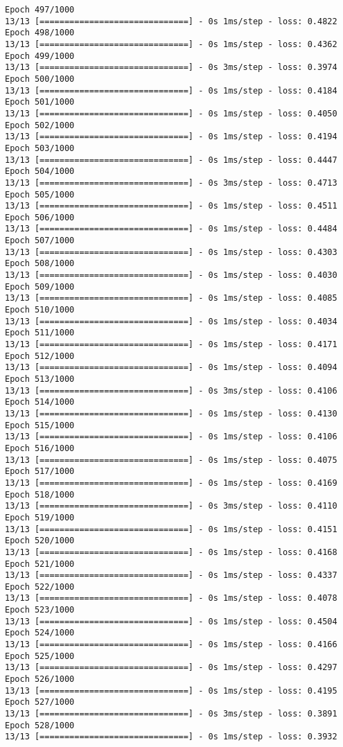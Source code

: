 \documentclass[11pt]{article}
\begin{document}
\begin{Verbatim}[commandchars=\\\{\}]
Epoch 497/1000
13/13 [==============================] - 0s 1ms/step - loss: 0.4822
Epoch 498/1000
13/13 [==============================] - 0s 1ms/step - loss: 0.4362
Epoch 499/1000
13/13 [==============================] - 0s 3ms/step - loss: 0.3974
Epoch 500/1000
13/13 [==============================] - 0s 1ms/step - loss: 0.4184
Epoch 501/1000
13/13 [==============================] - 0s 1ms/step - loss: 0.4050
Epoch 502/1000
13/13 [==============================] - 0s 1ms/step - loss: 0.4194
Epoch 503/1000
13/13 [==============================] - 0s 1ms/step - loss: 0.4447
Epoch 504/1000
13/13 [==============================] - 0s 3ms/step - loss: 0.4713
Epoch 505/1000
13/13 [==============================] - 0s 1ms/step - loss: 0.4511
Epoch 506/1000
13/13 [==============================] - 0s 1ms/step - loss: 0.4484
Epoch 507/1000
13/13 [==============================] - 0s 1ms/step - loss: 0.4303
Epoch 508/1000
13/13 [==============================] - 0s 1ms/step - loss: 0.4030
Epoch 509/1000
13/13 [==============================] - 0s 1ms/step - loss: 0.4085
Epoch 510/1000
13/13 [==============================] - 0s 1ms/step - loss: 0.4034
Epoch 511/1000
13/13 [==============================] - 0s 1ms/step - loss: 0.4171
Epoch 512/1000
13/13 [==============================] - 0s 1ms/step - loss: 0.4094
Epoch 513/1000
13/13 [==============================] - 0s 3ms/step - loss: 0.4106
Epoch 514/1000
13/13 [==============================] - 0s 1ms/step - loss: 0.4130
Epoch 515/1000
13/13 [==============================] - 0s 1ms/step - loss: 0.4106
Epoch 516/1000
13/13 [==============================] - 0s 1ms/step - loss: 0.4075
Epoch 517/1000
13/13 [==============================] - 0s 1ms/step - loss: 0.4169
Epoch 518/1000
13/13 [==============================] - 0s 3ms/step - loss: 0.4110
Epoch 519/1000
13/13 [==============================] - 0s 1ms/step - loss: 0.4151
Epoch 520/1000
13/13 [==============================] - 0s 1ms/step - loss: 0.4168
Epoch 521/1000
13/13 [==============================] - 0s 1ms/step - loss: 0.4337
Epoch 522/1000
13/13 [==============================] - 0s 1ms/step - loss: 0.4078
Epoch 523/1000
13/13 [==============================] - 0s 1ms/step - loss: 0.4504
Epoch 524/1000
13/13 [==============================] - 0s 1ms/step - loss: 0.4166
Epoch 525/1000
13/13 [==============================] - 0s 1ms/step - loss: 0.4297
Epoch 526/1000
13/13 [==============================] - 0s 1ms/step - loss: 0.4195
Epoch 527/1000
13/13 [==============================] - 0s 3ms/step - loss: 0.3891
Epoch 528/1000
13/13 [==============================] - 0s 1ms/step - loss: 0.3932

\end{Verbatim}
\end{document}
